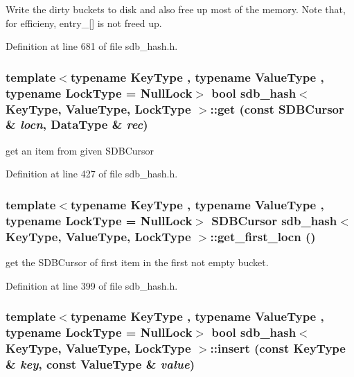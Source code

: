 Write the dirty buckets to disk and also free up most of the memory. Note that, for efficieny, entry\_\-\mbox{[}\mbox{]} is not freed up. 

Definition at line 681 of file sdb\_\-hash.h.\hypertarget{classsdb__hash_7e501588a5161276baff02c6812aa147}{
\subsubsection[{get}]{\setlength{\rightskip}{0pt plus 5cm}template$<$typename KeyType , typename ValueType , typename LockType  = NullLock$>$ bool {\bf sdb\_\-hash}$<$ KeyType, ValueType, LockType $>$::get (const SDBCursor \& {\em locn}, \/  DataType \& {\em rec})}}
\label{classsdb__hash_7e501588a5161276baff02c6812aa147}


get an item from given SDBCursor 

Definition at line 427 of file sdb\_\-hash.h.\hypertarget{classsdb__hash_18aa637624e610e99727e368f750cef5}{
\subsubsection[{get\_\-first\_\-locn}]{\setlength{\rightskip}{0pt plus 5cm}template$<$typename KeyType , typename ValueType , typename LockType  = NullLock$>$ SDBCursor {\bf sdb\_\-hash}$<$ KeyType, ValueType, LockType $>$::get\_\-first\_\-locn ()}}
\label{classsdb__hash_18aa637624e610e99727e368f750cef5}


get the SDBCursor of first item in the first not empty bucket. 

Definition at line 399 of file sdb\_\-hash.h.\hypertarget{classsdb__hash_4cd4dcd9d599a843b63d7dda5275131f}{
\subsubsection[{insert}]{\setlength{\rightskip}{0pt plus 5cm}template$<$typename KeyType , typename ValueType , typename LockType  = NullLock$>$ bool {\bf sdb\_\-hash}$<$ KeyType, ValueType, LockType $>$::insert (const KeyType \& {\em key}, \/  const ValueType \& {\em value})}}
\label{classsdb__hash_4cd4dcd9d599a843b63d7dda5275131f}


